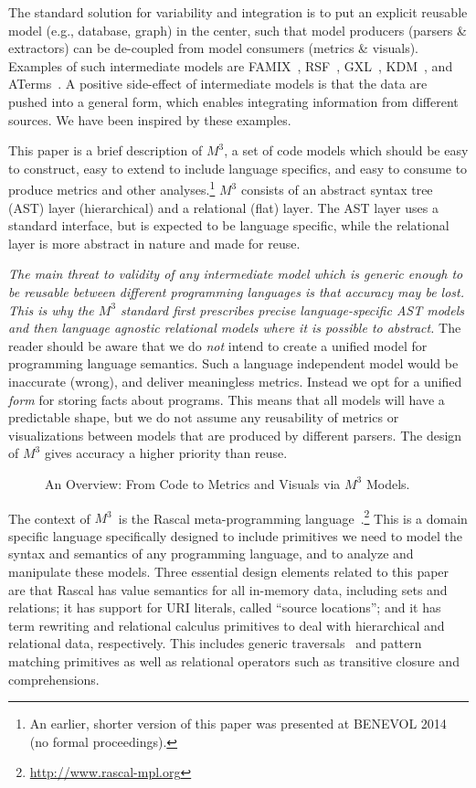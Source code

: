 \documentclass[conference]{IEEEtran}
\newcommand{\mthree}{\ensuremath{M^3}\xspace}
\begin{document}
The standard solution for variability and integration is to put an explicit
reusable model (e.g., database, graph) in the center, such that model
producers (parsers \& extractors) can be de-coupled from model consumers
(metrics \& visuals). Examples of such intermediate models are
FAMIX~\cite{famix}, RSF~\cite{Mueller88}, GXL~\cite{HWS00}, KDM~\cite{omg-kdm},
and ATerms~\cite{BJKO00}. A positive side-effect of intermediate models
is that the data are pushed into a general form, which enables integrating
information from different sources. We have been inspired by these examples.

This paper is a brief description of \mthree, a set of code models which
should be easy to construct, easy to extend to include language specifics, and
easy to consume to produce metrics and other analyses.\!\footnote{An earlier,
shorter version of this paper was presented at BENEVOL 2014 (no formal
proceedings).} \mthree consists of an abstract syntax tree (AST) layer
(hierarchical) and a relational (flat) layer. The AST layer uses a standard
interface, but is expected to be language specific, while the relational layer
is more abstract in nature and made for reuse.

\emph{The main threat to validity of any intermediate model which is generic
enough to be reusable between different programming languages is that accuracy
may be lost. This is why the \mthree standard first prescribes precise
language-specific AST models and then language agnostic relational models
where it is possible to abstract.} The reader should be aware that we do
\emph{not} intend to create a unified model for programming language
semantics. Such a language independent model would be inaccurate (wrong), and
deliver meaningless metrics. Instead we opt for a unified \emph{form} for
storing facts about programs. This means that all models will have a
predictable shape, but we do not assume any reusability of metrics or
visualizations between models that are produced by different parsers. The
design of \mthree  gives accuracy a higher priority than reuse.

\begin{figure}[t]
	\resizebox{\columnwidth}{!}{}
\caption{An Overview: From Code to Metrics and Visuals via \mthree Models.}
\end{figure}

The context of \mthree\ is the Rascal meta-programming language~\cite{KvdSV-
Rascal11,rascalscam}.\footnote{\url{http://www.rascal-mpl.org}} This is a
domain specific language specifically designed to include primitives we need
to model the syntax and semantics of any programming language, and to analyze
and manipulate these models. Three essential design elements related to this
paper are that Rascal has value semantics for all in-memory data, including
sets and relations; it has support for URI literals, called ``source
locations''; and it has term rewriting and relational calculus primitives to
deal with hierarchical and relational data, respectively. This includes
generic traversals~\cite{Traversals} and pattern matching primitives as well
as relational operators such as transitive closure and comprehensions.
\end{document}
